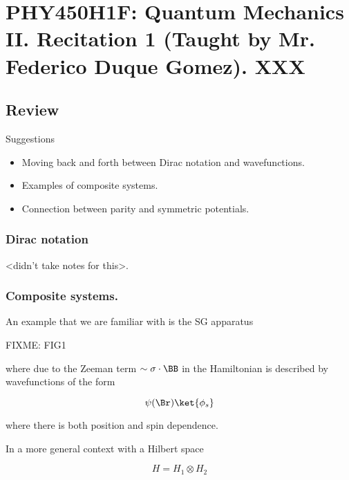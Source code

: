 
%

\chapter{PHY450H1F: Quantum Mechanics II.  Recitation 1 (Taught by Mr. Federico Duque Gomez).  XXX}
\label{chap:qmTwoR1}
{}
\date{Sept 16, 2011}

\beginArtWithToc

\section{Review}

Suggestions
\begin{itemize}
\item Moving back and forth between Dirac notation and wavefunctions.
\item Examples of composite systems.
\item Connection between parity and symmetric potentials.
\end{itemize}

\subsection{Dirac notation}

<didn't take notes for this>.

\subsection{Composite systems.}

An example that we are familiar with is the SG apparatus

FIXME: FIG1

where due to the Zeeman term $\sim \sigma \cdot \BB$ in the Hamiltonian is described by wavefunctions of the form

\begin{equation}\label{eqn:qmTwoR1:10}
\psi(\Br) \ket{\phi_s}
\end{equation}

where there is both position and spin dependence.

In a more general context with a Hilbert space

\begin{equation}\label{eqn:qmTwoR1:30}
H = H_1 \otimes H_2
\end{equation}

